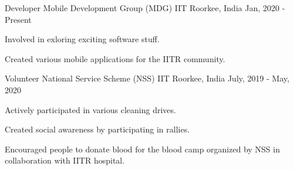 

\begin{cventries}

  \cventry
    {Developer} %
    {Mobile Development Group (MDG)} %
    {IIT Roorkee, India} %
    {Jan, 2020 - Present} %
    {
      \begin{cvitems} %
        \item {Involved in exloring exciting software stuff.}
        \item {Created various mobile applications for the IITR community.}
      \end{cvitems}
    }

  \cventry
    {Volunteer} %
    {National Service Scheme (NSS)} %
    {IIT Roorkee, India} %
    {July, 2019 - May, 2020} %
    {
      \begin{cvitems} %
        \item {Actively participated in various cleaning drives.}
        \item {Created social awareness by participating in rallies.}
        \item {Encouraged people to donate blood for the blood camp organized by NSS in collaboration with IITR hospital.}
      \end{cvitems}
    }

\end{cventries}